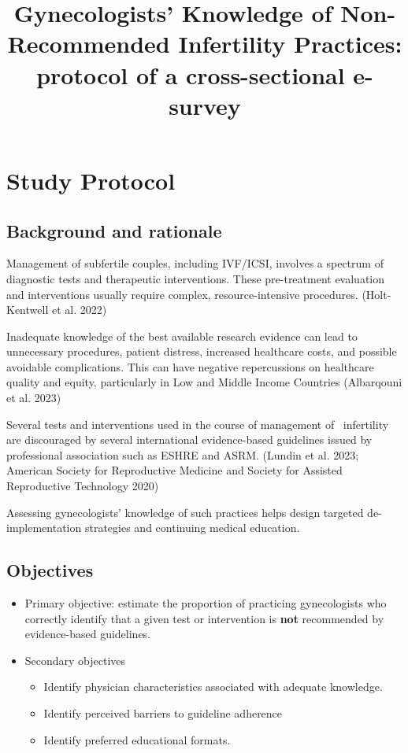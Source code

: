 \documentclass[
  letterpaper,
  DIV=11,
  numbers=noendperiod]{scrartcl}
\title{Gynecologists' Knowledge of Non-Recommended Infertility
Practices: protocol of a cross-sectional e-survey}
\author{}
\date{}
\begin{document}
\maketitle


\section{Study Protocol}\label{study-protocol}

\subsection{Background and rationale}\label{background-and-rationale}

Management of subfertile couples, including IVF/ICSI, involves a
spectrum of diagnostic tests and therapeutic interventions. These
pre-treatment evaluation and interventions usually require complex,
resource-intensive procedures. (Holt-Kentwell et al. 2022)

Inadequate knowledge of the best available research evidence can lead to
unnecessary procedures, patient distress, increased healthcare costs,
and possible avoidable complications. This can have negative
repercussions on healthcare quality and equity, particularly in Low and
Middle Income Countries (Albarqouni et al. 2023)

Several tests and interventions used in the course of management of
~infertility are discouraged by several international evidence-based
guidelines issued by professional association such as ESHRE and ASRM.
(Lundin et al. 2023; American Society for Reproductive Medicine and
Society for Assisted Reproductive Technology 2020)

Assessing gynecologists' knowledge of such practices helps design
targeted de-implementation strategies and continuing medical education.

\subsection{Objectives}\label{objectives}

\begin{itemize}
\item
  Primary objective: estimate the proportion of practicing gynecologists
  who correctly identify that a given test or intervention is
  \textbf{not} recommended by evidence-based guidelines.
\item
  Secondary objectives

  \begin{itemize}
  \item
    Identify physician characteristics associated with adequate
    knowledge.
  \item
    Identify perceived barriers to guideline adherence
  \item
    Identify preferred educational formats.
  \end{itemize}
\end{itemize}
\end{document}
